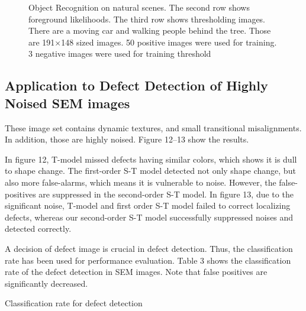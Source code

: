 \documentclass[conference]{IEEEtran}
\begin{document}
\begin{figure}[!t]
  \hfill
  \hfill
  \caption{Object Recognition on natural scenes. The second row shows foreground likelihoods. The third row shows thresholding images. There are a moving car and walking people behind the tree. Those are 191×148 sized images. 50 positive images were used for training. 3 negative images were used for training threshold}
\end{figure}

\subsection{Application to Defect Detection of Highly Noised SEM images}
These image set contains dynamic textures, and small transitional misalignments. In addition, those are highly noised. Figure 12–13 show the results. 

In figure 12, T-model missed defects having similar colors, which shows it is dull to shape change. The first-order S-T model detected not only shape change, but also more false-alarms, which means it is vulnerable to noise. However, the false-positives are suppressed in the second-order S-T model. In figure 13, due to the significant noise, T-model and first order S-T model failed to correct localizing defects, whereas our second-order S-T model successfully suppressed noises and detected correctly.

A decision of defect image is crucial in defect detection. Thus, the classification rate has been used for performance evaluation. Table 3 shows the classification rate of the defect detection in SEM images. Note that false positives are significantly decreased.

\begin{table}[!t]
  \centering
  \label{tab:10}
  \caption{Classification rate for defect detection}
\end{table}
\end{document}
